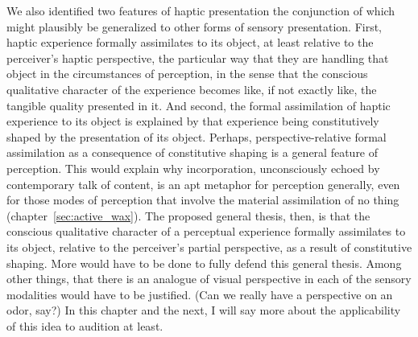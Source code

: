 We also identified two features of haptic presentation the conjunction of which might plausibly be generalized to other forms of sensory presentation. First, haptic experience formally assimilates to its object, at least relative to the perceiver's haptic perspective, the particular way that they are handling that object in the circumstances of perception, in the sense that the conscious qualitative character of the experience becomes like, if not exactly like, the tangible quality presented in it. And second, the formal assimilation of haptic experience to its object is explained by that experience being constitutively shaped by the presentation of its object. Perhaps, perspective-relative formal assimilation as a consequence of constitutive shaping is a general feature of perception. This would explain why incorporation, unconsciously echoed by contemporary talk of content, is an apt metaphor for perception generally, even for those modes of perception that involve the material assimilation of no thing (chapter~\ref{sec:active_wax}). The proposed general thesis, then, is that the conscious qualitative character of a perceptual experience formally assimilates to its object, relative to the perceiver's partial perspective, as a result of constitutive shaping. More would have to be done to fully defend this general thesis. Among other things, that there is an analogue of visual perspective in each of the sensory modalities would have to be justified. (Can we really have a perspective on an odor, say?) In this chapter and the next, I will say more about the applicability of this idea to audition at least. 

